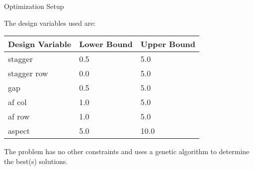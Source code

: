 \begin{frame}{Optimization Setup}

The design variables used are:

\begin{table}[h]
  \centering
      \begin{tabular}{lll}
        \toprule[1.5pt]
        \textbf{Design Variable} & \textbf{Lower Bound} & \textbf{Upper Bound} \\
        \midrule
        stagger     & 0.5 & 5.0 \\
        stagger row & 0.0 & 5.0 \\
        gap         & 0.5 & 5.0 \\
        af col      & 1.0 & 5.0 \\
        af row      & 1.0 & 5.0 \\
        aspect      & 5.0 & 10.0 \\
        \bottomrule[1.5pt]
      \end{tabular}
\end{table}

\noindent The problem has no other constraints and uses a genetic algorithm to determine the best(s) solutions.

\end{frame}
